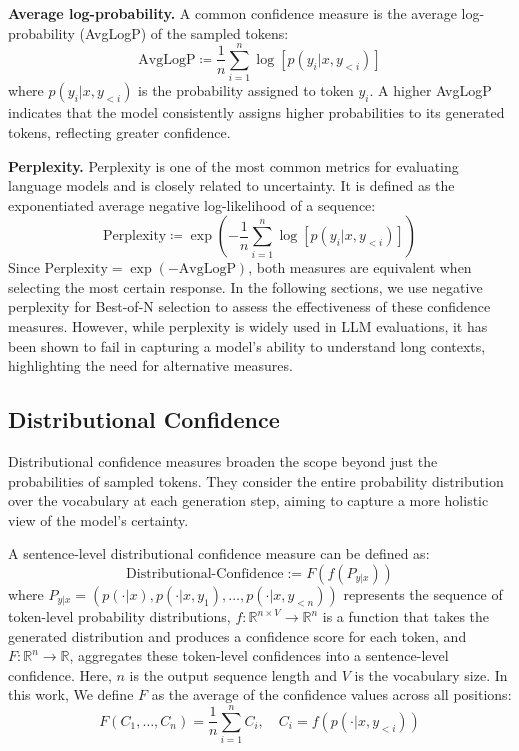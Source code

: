\textbf{Average log-probability.} A common confidence measure is the average log-probability (AvgLogP) of the sampled tokens:
\begin{equation}
    \text{AvgLogP} \coloneqq \frac{1}{n}\sum_{i=1}^n\log\left[p(y_i|x,y_{<i})\right] \nonumber
\end{equation}
where \(p(y_i|x,y_{<i})\) is the probability assigned to token \(y_i\). A higher AvgLogP indicates that the model consistently assigns higher probabilities to its generated tokens, reflecting greater confidence.


\textbf{Perplexity.} Perplexity is one of the most common metrics for evaluating language models and is closely related to uncertainty. It is defined as the exponentiated average negative log-likelihood of a sequence:
\begin{equation}\label{eq:perplexity}
    \text{Perplexity} \coloneqq \exp\left(-\frac{1}{n}\sum_{i=1}^n\log\left[p(y_i|x,y_{<i})\right]\right) 
\end{equation}
Since \(\text{Perplexity} = \exp(-\text{AvgLogP})\), both measures are equivalent when selecting the most certain response. In the following sections, we use negative perplexity for Best-of-N selection to assess the effectiveness of these confidence measures. However, while perplexity is widely used in LLM evaluations, it has been shown \cite{hu2024can} to fail in capturing a model’s ability to understand long contexts, highlighting the need for alternative measures.




\subsection{Distributional Confidence}
Distributional confidence measures broaden the scope beyond just the probabilities of sampled tokens. They consider the entire probability distribution over the vocabulary at each generation step, aiming to capture a more holistic view of the model's certainty.

A sentence-level distributional confidence measure can be defined as:
\begin{equation}
    \text{Distributional-Confidence} :=  F(f(P_{y|x})) \nonumber
\end{equation}
where \(P_{y|x} = \left(p(\cdot|x), p(\cdot|x,y_{1}), \dots, p(\cdot|x,y_{< n})\right)\) represents the sequence of token-level probability distributions, \(f: \mathbb{R}^{n\times V} \to \mathbb{R}^n\) is a function that takes the generated distribution and produces a confidence score for each token, and \(F: \mathbb{R}^{n}
\to \mathbb{R}\), aggregates these token-level confidences into a sentence-level confidence. Here, \(n\) is the output sequence length and \(V\) is the vocabulary size. In this work, We define \(F\) as the average of the confidence values across all positions:
\begin{equation}\label{eq:DC}
    F(C_1, \dots, C_n) = \frac{1}{n} \sum_{i=1}^{n} C_{i}, \quad C_{i} = f(p(\cdot|x,y_{<i}))  
\end{equation}


